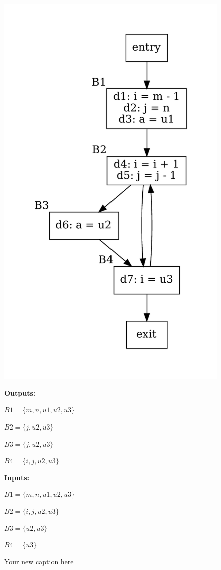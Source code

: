 \documentclass{article}
\begin{document}
\begin{figure}[H]
    \centering
    \begin{minipage}{0.45\textwidth}
        \includegraphics[width=\linewidth]{graphs/liveness_reaching.pdf}
    \end{minipage}%
    \begin{minipage}{0.45\textwidth}
        \textbf{Outputs:}
        
        $B1 = \{m, n, u1, u2, u3\}$
        
        $B2 = \{j, u2, u3\}$
        
        $B3 = \{j, u2, u3\}$
        
        $B4 = \{i, j , u2, u3\}$

        \textbf{Inputs:}
        
        $B1 = \{m, n, u1, u2, u3\}$
        
        $B2 = \{i, j, u2, u3\}$
        
        $B3 = \{u2, u3\}$
        
        $B4 = \{u3\}$
    \end{minipage}
    \caption{Your new caption here}
\end{figure}
\end{document}
